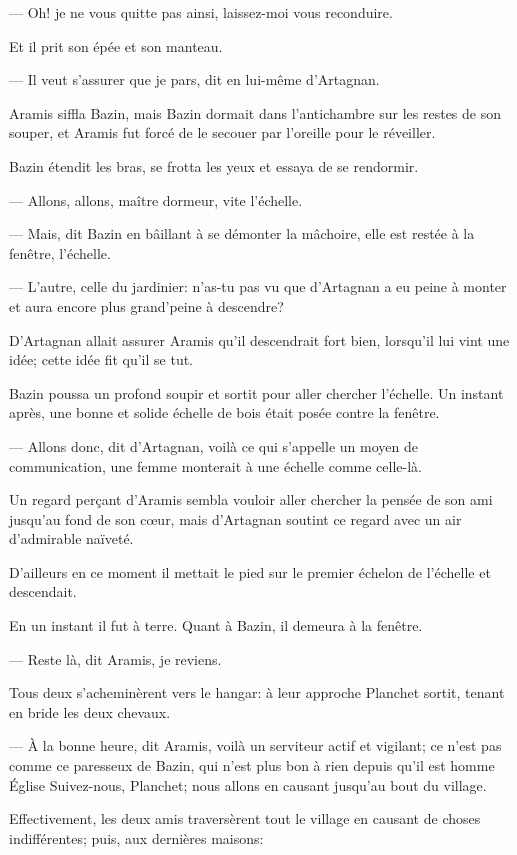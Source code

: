 — Oh! je ne vous quitte pas ainsi, laissez-moi vous reconduire.

Et il prit son épée et son manteau.

— Il veut s'assurer que je pars, dit en lui-même d'Artagnan.

Aramis siffla Bazin, mais Bazin dormait dans l'antichambre sur les restes de son souper, et Aramis fut forcé de le secouer par l'oreille pour le réveiller.

Bazin étendit les bras, se frotta les yeux et essaya de se rendormir.

— Allons, allons, maître dormeur, vite l'échelle.

— Mais, dit Bazin en bâillant à se démonter la mâchoire, elle est restée à la fenêtre, l'échelle.

— L'autre, celle du jardinier: n'as-tu pas vu que d'Artagnan a eu peine à monter et aura encore plus grand'peine à descendre?

D'Artagnan allait assurer Aramis qu'il descendrait fort bien, lorsqu'il lui vint une idée; cette idée fit qu'il se tut.

Bazin poussa un profond soupir et sortit pour aller chercher l'échelle. Un instant après, une bonne et solide échelle de bois était posée contre la fenêtre.

— Allons donc, dit d'Artagnan, voilà ce qui s'appelle un moyen de communication, une femme monterait à une échelle comme celle-là.

Un regard perçant d'Aramis sembla vouloir aller chercher la pensée de son ami jusqu'au fond de son cœur, mais d'Artagnan soutint ce regard avec un air d'admirable naïveté.

D'ailleurs en ce moment il mettait le pied sur le premier échelon de l'échelle et descendait.

En un instant il fut à terre. Quant à Bazin, il demeura à la fenêtre.

— Reste là, dit Aramis, je reviens.

Tous deux s'acheminèrent vers le hangar: à leur approche Planchet sortit, tenant en bride les deux chevaux.

— À la bonne heure, dit Aramis, voilà un serviteur actif et vigilant; ce n'est pas comme ce paresseux de Bazin, qui n'est plus bon à rien depuis qu'il est homme Église Suivez-nous, Planchet; nous allons en causant jusqu'au bout du village.

Effectivement, les deux amis traversèrent tout le village en causant de choses indifférentes; puis, aux dernières maisons:


